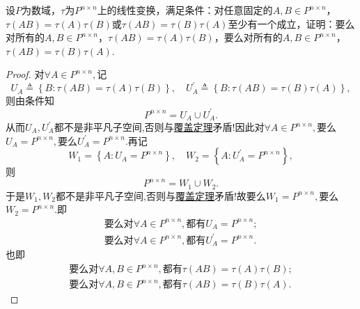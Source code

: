\documentclass[../../main.tex]{subfiles}%
\begin{document}
\begin{example}
设\( P \)为数域，\( \tau \)为\( P^{n \times n} \)上的线性变换，满足条件：对任意固定的\( A, B \in P^{n \times n} \)，\( \tau(AB) = \tau(A)\tau(B) \)或\( \tau(AB) = \tau(B)\tau(A) \)至少有一个成立，证明：要么对所有的\( A, B \in P^{n \times n} \)，\( \tau(AB) = \tau(A)\tau(B) \)，要么对所有的\( A, B \in P^{n \times n} \)，\( \tau(AB) = \tau(B)\tau(A) \).
\end{example}
\begin{proof}
对$\forall A\in P^{n\times n},$记
$$U_A\triangleq \left\{ B:\tau \left( AB \right) =\tau \left( A \right) \tau \left( B \right) \right\}, \quad U_{A}^{\prime}\triangleq \left\{ B:\tau \left( AB \right) =\tau \left( B \right) \tau \left( A \right) \right\},$$
则由条件知
$$P^{n\times n}=U_A\cup U_{A}^{\prime}.$$
从而$U_A,U_{A}^{\prime}$都不是非平凡子空间,否则与\hyperref[theorem:覆盖定理]{覆盖定理}矛盾!因此对$\forall A\in P^{n\times n},$要么$U_A=P^{n\times n},$要么$U_{A}^{\prime}=P^{n\times n}.$再记
$$W_1=\left\{ A:U_A=P^{n\times n} \right\}, \quad W_2=\left\{ A:U_{A}^{\prime}=P^{n\times n} \right\},$$
则
$$P^{n\times n}=W_1\cup W_2.$$
于是$W_1,W_2$都不是非平凡子空间,否则与\hyperref[theorem:覆盖定理]{覆盖定理}矛盾!故要么$W_1=P^{n\times n},$要么$W_2=P^{n\times n}.$即
\begin{align*}
\text{要么对}\forall A\in P^{n\times n},\text{都有}U_A=P^{n\times n};
\\
\text{要么对}\forall A\in P^{n\times n},\text{都有}U_{A}^{\prime}=P^{n\times n}.
\end{align*}
也即
\begin{align*}
\text{要么对}\forall A,B\in P^{n\times n},\text{都有}\tau \left( AB \right) =\tau \left( A \right) \tau \left( B \right) ;
\\
\text{要么对}\forall A,B\in P^{n\times n},\text{都有}\tau \left( AB \right) =\tau \left( B \right) \tau \left( A \right) .
\end{align*}
\end{proof}
\end{document}
